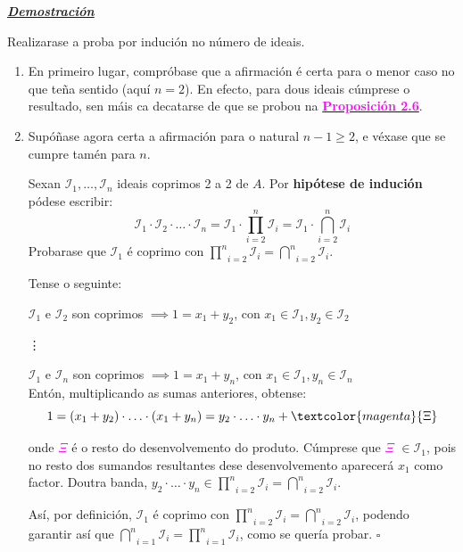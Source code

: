 \documentclass[twoside]{report}
\newcommand{\magbf}[1]{\textcolor{magenta}{\textbf{#1}}} %
\theoremstyle{mystyle}
\begin{document}
\vspace{2mm}

\noindent \textbf{\textit{\underline{Demostración}}}

\vspace{2mm}

\noindent Realizarase a proba por indución no número de ideais. 
\begin{enumerate}
    \item En primeiro lugar, compróbase que a afirmación é certa para o menor caso no que teña sentido (aquí $n = 2$). En efecto, para dous ideais cúmprese o resultado, sen máis ca decatarse de que se probou na \hyperref[prop2.6]{\magbf{Proposición 2.6}}.\\
    \item Supóñase agora certa a afirmación para o natural $n-1 \geq 2$, e véxase que se cumpre tamén para $n$.
    
    Sexan $\mathcal{I}_{1}, \ldots, \mathcal{I}_{n}$ ideais coprimos 2 a 2 de $A$. Por \textbf{hipótese de indución} pódese escribir:
    $$\mathcal{I}_{1} \cdot \mathcal{I}_{2} \cdot \ldots \cdot \mathcal{I}_{n} = \mathcal{I}_{1} \cdot \underset{i = 2}{\overset{n}{\prod}}\mathcal{I}_{i} = \mathcal{I}_{1} \cdot \underset{i = 2}{\overset{n}{\bigcap}}\mathcal{I}_{i}$$
    Probarase que $\mathcal{I}_{1}$ é coprimo con $\underset{i = 2}{\overset{n}{\prod}}\mathcal{I}_{i} = \underset{i = 2}{\overset{n}{\bigcap}}\mathcal{I}_{i}$.
    
    Tense o seguinte:
    
    \vspace{2mm}
    
    $\mathcal{I}_{1}$ e $\mathcal{I}_{2}$ son coprimos $\implies 1 = x_{1} + y_{2}$, con $x_{1} \in \mathcal{I}_{1}, y_{2} \in \mathcal{I}_{2}$
    
    \noindent \vdots
    
    $\mathcal{I}_{1}$ e $\mathcal{I}_{n}$ son coprimos $\implies 1 = x_{1} + y_{n}$, con $x_{1} \in \mathcal{I}_{1}, y_{n} \in \mathcal{I}_{n}$  \\  
    
    Entón, multiplicando as sumas anteriores, obtense:
    $$1 = (x_{1} + y_{2}) \cdot \ldots \cdot (x_{1} + y_{n}) = y_{2} \cdot \ldots \cdot y_{n} + \textcolor{magenta}{\Xi}$$
    
    onde \textcolor{magenta}{$\Xi$} é o resto do desenvolvemento do produto. Cúmprese que \textcolor{magenta}{$\Xi$} $\in \mathcal{I}_{1}$, pois no resto dos sumandos resultantes dese desenvolvemento aparecerá $x_{1}$ como factor. Doutra banda, $y_{2} \cdot \ldots \cdot y_{n} \in \underset{i = 2}{\overset{n}{\prod}}\mathcal{I}_{i} = \underset{i = 2}{\overset{n}{\bigcap}}\mathcal{I}_{i}$.
    
    Así, por definición, $\mathcal{I}_{1}$ é coprimo con $\underset{i = 2}{\overset{n}{\prod}}\mathcal{I}_{i} = \underset{i = 2}{\overset{n}{\bigcap}}\mathcal{I}_{i}$, podendo garantir así que $\underset{i = 1}{\overset{n}{\bigcap}}\mathcal{I}_{i} = \underset{i = 1}{\overset{n}{\prod}}\mathcal{I}_{i}$, como se quería probar. $\square$
\end{enumerate}
\end{document}
